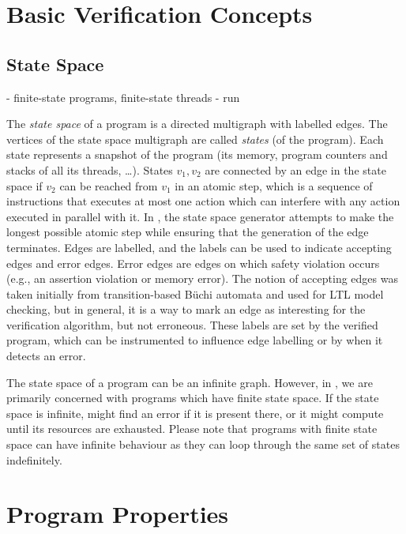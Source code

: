 \section{Basic Verification Concepts}

\subsection{State Space}

- finite-state programs, finite-state threads
- run

The \emph{state space} of a program is a directed multigraph with labelled edges.
The vertices of the state space multigraph are called \emph{states} (of the program).
Each state represents a snapshot of the program (its memory, program counters and stacks of all its threads, …).
States $v_1, v_2$ are connected by an edge in the state space if $v_2$ can be reached from $v_1$ in an atomic step, which is a sequence of instructions that executes at most one action which can interfere with any action executed in parallel with it.
In \divine, the state space generator attempts to make the longest possible atomic step while ensuring that the generation of the edge terminates.
Edges are labelled, and the labels can be used to indicate accepting edges and error edges.
Error edges are edges on which safety violation occurs (e.g., an assertion violation or memory error).
The notion of accepting edges was taken initially from transition-based Büchi automata and used for LTL model checking, but in general, it is a way to mark an edge as interesting for the verification algorithm, but not erroneous.
These labels are set by the verified program, which can be instrumented to influence edge labelling or by \divine when it detects an error.

The state space of a program can be an infinite graph.
However, in \divine, we are primarily concerned with programs which have finite state space.
If the state space is infinite, \divine might find an error if it is present
there, or it might compute until its resources are exhausted.
Please note that programs with finite state space can have infinite behaviour as they can loop through the same set of states indefinitely.

\section{Program Properties}

